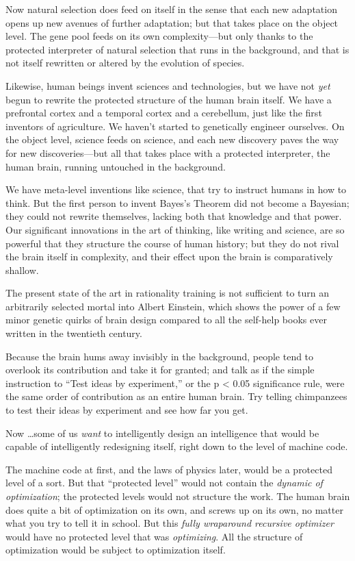 {
 Now natural selection does feed on itself in the sense that each
new adaptation opens up new avenues of further adaptation; but that
takes place on the object level. The gene pool feeds on its own
complexity---but only thanks to the protected interpreter of natural
selection that runs in the background, and that is not itself rewritten
or altered by the evolution of species.}

{
 Likewise, human beings invent sciences and technologies, but we
have not \textit{yet} begun to rewrite the protected structure of the
human brain itself. We have a prefrontal cortex and a temporal cortex
and a cerebellum, just like the first inventors of agriculture. We
haven't started to genetically engineer ourselves. On
the object level, science feeds on science, and each new discovery
paves the way for new discoveries---but all that takes place with a
protected interpreter, the human brain, running untouched in the
background.}

{
 We have meta-level inventions like science, that try to instruct
humans in how to think. But the first person to invent
Bayes's Theorem did not become a Bayesian; they could
not rewrite themselves, lacking both that knowledge and that power. Our
significant innovations in the art of thinking, like writing and
science, are so powerful that they structure the course of human
history; but they do not rival the brain itself in complexity, and
their effect upon the brain is comparatively shallow.}

{
 The present state of the art in rationality training is not
sufficient to turn an arbitrarily selected mortal into Albert Einstein,
which shows the power of a few minor genetic quirks of brain design
compared to all the self-help books ever written in the twentieth
century.}

{
 Because the brain hums away invisibly in the background, people
tend to overlook its contribution and take it for granted; and talk as
if the simple instruction to ``Test ideas by
experiment,'' or the p {\textless} 0.05 significance
rule, were the same order of contribution as an entire human brain. Try
telling chimpanzees to test their ideas by experiment and see how far
you get.}

{
 Now \ldots some of us \textit{want} to intelligently design an
intelligence that would be capable of intelligently redesigning itself,
right down to the level of machine code.}

{
 The machine code at first, and the laws of physics later, would be
a protected level of a sort. But that ``protected
level'' would not contain the \textit{dynamic of
optimization}; the protected levels would not structure the work. The
human brain does quite a bit of optimization on its own, and screws up
on its own, no matter what you try to tell it in school. But this
\textit{fully wraparound recursive optimizer} would have no protected
level that was \textit{optimizing}. All the structure of optimization
would be subject to optimization itself.}


